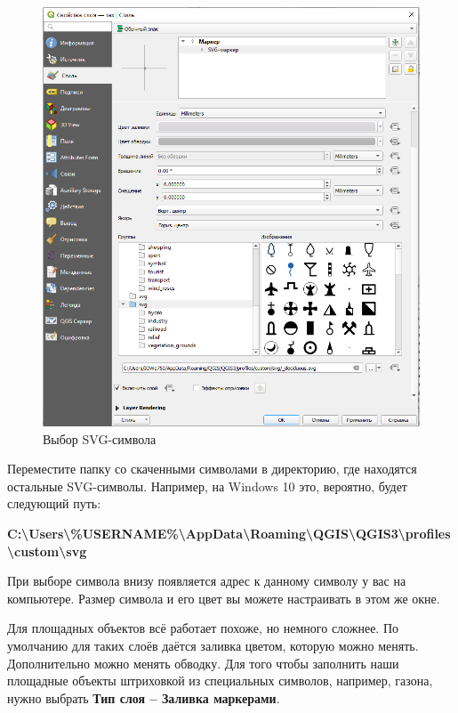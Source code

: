 \documentclass[
  12pt,
]{book}
\begin{document}
\begin{figure}
\centering
\includegraphics{images/symbology/Svg_selection.png}
\caption{Выбор SVG-символа}
\end{figure}

Переместите папку со скаченными символами в директорию, где находятся остальные SVG-символы. Например, на Windows 10 это, вероятно, будет следующий путь:

\textbf{C:\textbackslash Users\textbackslash\%USERNAME\%\textbackslash AppData\textbackslash Roaming\textbackslash QGIS\textbackslash QGIS3\textbackslash profiles\textbackslash custom\textbackslash svg}

При выборе символа внизу появляется адрес к данному символу у вас на компьютере. Размер символа и его цвет вы можете настраивать в этом же окне.

Для площадных объектов всё работает похоже, но немного сложнее. По умолчанию для таких слоёв даётся заливка цветом, которую можно менять. Дополнительно можно менять обводку. Для того чтобы заполнить наши площадные объекты штриховкой из специальных символов, например, газона, нужно выбрать \textbf{Тип слоя -- Заливка маркерами}.
\end{document}

